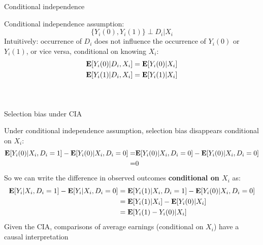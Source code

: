 \documentclass[compress, 8pt]{beamer}
\begin{document}
\begin{frame}{Conditional independence}

Conditional independence assumption: 
\begin{equation*}
    \{Y_i(0), Y_i(1)\} \perp D_i \vert X_i
\end{equation*}
Intuitively: occurrence of $D_i$ does not influence the occurrence of $Y_i(0)$ or $Y_i(1)$, or vice versa, conditional on knowing $X_i$:
\begin{align*}
    \mathbf{E}[Y_i(0) \vert D_i, X_i] &= \mathbf{E} [Y_i(0) \vert X_i] \\
    \mathbf{E}[Y_i(1) \vert D_i, X_i] &= \mathbf{E} [Y_i(1) \vert X_i] 
\end{align*}

\begin{columns}
\begin{figure}
\end{figure}

\begin{figure}
\end{figure}

\end{columns}

\end{frame}


\begin{frame}{Selection bias under CIA}

Under conditional independence assumption, selection bias disappears conditional on $X_i$:
\begin{align*}
    \mathbf{E} [Y_i(0) \vert X_i, D_i = 1] - \mathbf{E} [Y_i(0) \vert X_i, D_i = 0]
    =& \mathbf{E} [Y_i(0) \vert X_i, D_i = 0] - \mathbf{E} [Y_i(0) \vert X_i, D_i = 0] \\
    =& 0
\end{align*}
So we can write the difference in observed outcomes \textbf{conditional on $X_i$} as:
\begin{align*}
    \mathbf{E} [Y_i \vert X_i, D_i = 1] - \mathbf{E} [Y_i \vert X_i, D_i = 0] 
    &= \mathbf{E} [Y_i(1) \vert X_i, D_i = 1] - \mathbf{E} [Y_i(0) \vert X_i, D_i = 0] \\
    &= \mathbf{E} [Y_i(1) \vert X_i] - \mathbf{E} [Y_i(0) \vert X_i] \\
    &= \mathbf{E} [Y_i(1) - Y_i(0) \vert X_i]
\end{align*}
Given the CIA, comparisons of average earnings (conditional on $X_i$) have a causal interpretation
\end{frame}
\end{document}
